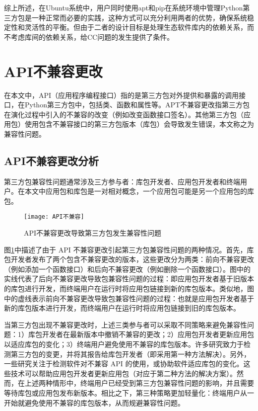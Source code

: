 综上所述，在Ubuntu系统中，用户同时使用apt和pip在系统环境中管理Python第三方包是一种正常而必要的实践，这种方式可以充分利用两者的优势，确保系统稳定性和灵活性的平衡。但由于二者的设计目标是处理生态软件库内的依赖关系，而不考虑库间的依赖关系，给CC问题的发生提供了条件。

\section{API不兼容更改}
在本文中，API（应用程序编程接口）指的是第三方包对外提供和暴露的调用接口，在Python第三方包中，包括类、函数和属性等。APT不兼容更改指第三方包在演化过程中引入的不兼容的改变（例如改变函数接口签名）。其他第三方包（应用包）使用包含不兼容接口的第三方包版本（库包）会导致发生错误，本文称之为兼容性问题。

\subsection{API不兼容更改分析}
第三方包兼容性问题通常涉及三方参与者：库包开发者、应用包开发者和终端用户。在本文中应用包和库包是一对相对概念，一个应用包可能是另一个应用包的库包。
\begin{figure}[t] %
	\centering
	\texttt{[image: API不兼容]}
	\caption{API不兼容更改导致第三方包发生兼容性问题}
	\label{fig:API}
\end{figure}
图\ref{fig:API}中描述了由于 API 不兼容更改引起第三方包兼容性问题的两种情况。首先，库包开发者发布了两个包含不兼容更改的版本，这些更改分为两类：前向不兼容更改（例如添加一个函数接口）和后向不兼容更改（例如删除一个函数接口）。图中的实线代表了后向不兼容更改导致包兼容性问题的过程：即应用包开发者基于旧版本的库包进行开发，而终端用户在运行时将应用包链接到新的库包版本。类似地，图中的虚线表示前向不兼容更改导致包兼容性问题的过程：也就是应用包开发者基于新的库包版本进行开发，而终端用户在运行时将应用包链接到旧的库包版本。

当第三方包出现不兼容更改时，上述三类参与者可以采取不同策略来避免兼容性问题：1）库包开发者在最新版本中撤销不兼容的更改；2）应用包开发者更新应用包以适应库包的变化；3）终端用户避免使用不兼容的库包版本。许多研究致力于检测第三方包的变更，并将其报告给库包开发者（即采用第一种方法解决）。另外，一些研究关注于检测软件对不兼容 API 的使用，或协助软件适应库包的变化。这些技术可以帮助应用包开发者更新应用包（对应于第二种方法的解决方案）。然而，在上述两种情形中，终端用户已经受到第三方包兼容性问题的影响，并且需要等待库包或应用包发布新版本。相比之下，第三种策略更加轻量化：终端用户从一开始就避免使用不兼容的库包版本，从而规避兼容性问题。

